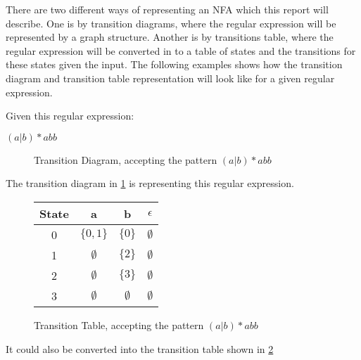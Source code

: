 There are two different ways of representing an NFA which this report will
describe. One is by transition diagrams, where the regular expression will be
represented by a graph structure. Another is by transitions table, where the 
regular expression will be converted in to a table of states and the 
transitions for these states given the input. The following examples shows how 
the transition diagram and transition table representation will look like for a 
given regular expression.

\begin{example} \label{regexp2td}
Given this regular expression:
\begin{center}
    $(a | b)* abb$ 
\end{center}

\begin{figure}[h!]
  \centering
  \caption{Transition Diagram, accepting the pattern $(a | b)* abb$
  \label{fig:td}}
\end{figure}

The transition diagram in \cref{fig:td} is representing this regular expression.

\begin{figure}[h!]
  \centering
  \begin{tabular}{| c | c c c |}
    \hline
    \hline
    State & a & b & $\epsilon$\\
    \hline
    0 & $\{0, 1\}$ & $\{0\}$ & $\emptyset$ \\
    1 & $\emptyset$ & $\{2\}$ & $\emptyset$ \\
    2 & $\emptyset$ & $\{3\}$ & $\emptyset$ \\
    3 & $\emptyset$ & $\emptyset$ & $\emptyset$ \\
    \hline
  \end{tabular}
  \caption{Transition Table, accepting the pattern $(a | b)* abb$
  \label{fig:tt}}
\end{figure}

It could also be converted into the transition table shown in \cref{fig:tt}
\end{example}

